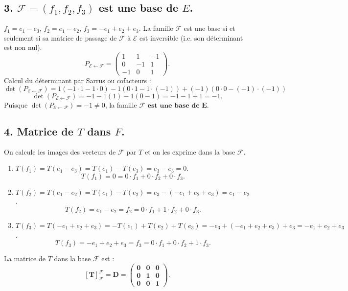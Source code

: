 \documentclass[french]{yLectureNote}
\begin{document}
\subsection*{3. $\mathcal{F}=(f_{1},f_{2},f_{3})$ est une base de $E$.}
$f_{1}=e_{1}-e_{3}$, $f_{2}=e_{1}-e_{2}$, $f_{3}=-e_{1}+e_{2}+e_{3}$.
La famille $\mathcal{F}$ est une base si et seulement si sa matrice de passage de $\mathcal{F}$ à $\mathcal{E}$ est inversible (i.e. son déterminant est non nul).
$$P_{\mathcal{E} \leftarrow \mathcal{F}} = \begin{pmatrix} 1 & 1 & -1 \\ 0 & -1 & 1 \\ -1 & 0 & 1 \end{pmatrix}.$$
Calcul du déterminant par Sarrus ou cofacteurs :
$$\det(P_{\mathcal{E} \leftarrow \mathcal{F}}) = 1(-1\cdot 1 - 1\cdot 0) - 1(0\cdot 1 - 1\cdot(-1)) + (-1)(0\cdot 0 - (-1)\cdot(-1))$$
$$\det(P_{\mathcal{E} \leftarrow \mathcal{F}}) = -1 - 1(1) - 1(0-1) = -1 - 1 + 1 = -1.$$
Puisque $\det(P_{\mathcal{E} \leftarrow \mathcal{F}}) = -1 \ne 0$, la famille $\mathbf{\mathcal{F} \text{ est une base de } E}$.

\subsection*{4. Matrice de $T$ dans $F$.}
On calcule les images des vecteurs de $\mathcal{F}$ par $T$ et on les exprime dans la base $\mathcal{F}$.
\begin{enumerate}
    \item $T(f_1) = T(e_1 - e_3) = T(e_1) - T(e_3) = e_3 - e_3 = 0$.
    $$T(f_1) = 0 = 0 \cdot f_1 + 0 \cdot f_2 + 0 \cdot f_3.$$
    \item $T(f_2) = T(e_1 - e_2) = T(e_1) - T(e_2) = e_3 - (-e_1+e_2+e_3) = e_1 - e_2$.
    $$T(f_2) = e_1 - e_2 = f_2 = 0 \cdot f_1 + 1 \cdot f_2 + 0 \cdot f_3.$$
    \item $T(f_3) = T(-e_1+e_2+e_3) = -T(e_1) + T(e_2) + T(e_3) = -e_3 + (-e_1+e_2+e_3) + e_3 = -e_1+e_2+e_3$.
    $$T(f_3) = -e_1+e_2+e_3 = f_3 = 0 \cdot f_1 + 0 \cdot f_2 + 1 \cdot f_3.$$
\end{enumerate}
La matrice de $T$ dans la base $\mathcal{F}$ est :
$$\mathbf{[T]_{\mathcal{F}}^{\mathcal{F}} = \mathbf{D} = \begin{pmatrix} 0 & 0 & 0 \\ 0 & 1 & 0 \\ 0 & 0 & 1 \end{pmatrix}.}$$
\end{document}
